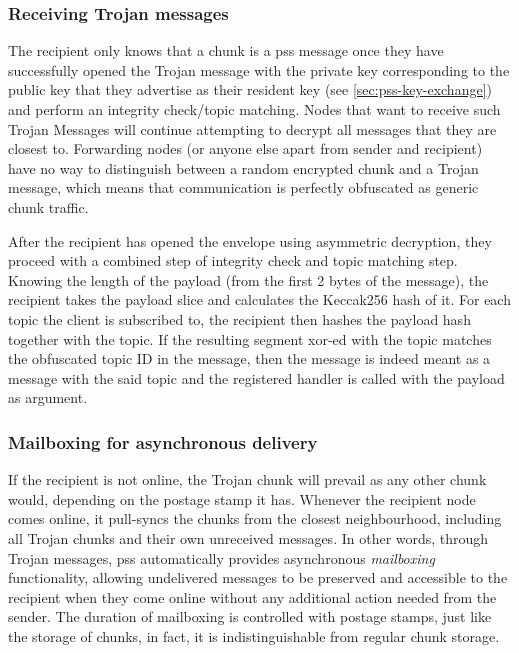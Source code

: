 \subsubsection{Receiving Trojan messages}

The recipient only knows that a chunk is a pss message once they have successfully opened the Trojan message with the private key corresponding to the public key that they advertise as their resident key (see \ref{sec:pss-key-exchange}) and perform an integrity check/topic matching. Nodes that want to receive such Trojan Messages will continue attempting to decrypt all messages that they are closest to. Forwarding nodes (or anyone else apart from sender and recipient) have no way to distinguish between a random encrypted chunk and a Trojan message, which means that communication is perfectly obfuscated as generic chunk traffic.

After the recipient has opened the envelope using asymmetric decryption, they proceed with a combined step of integrity check and topic matching step. Knowing the length of the payload (from the first 2 bytes of the message), the recipient takes the payload slice and calculates the Keccak256 hash of it. For each topic the client is subscribed to, the recipient then hashes the payload hash together with the topic. If the resulting segment xor-ed with the topic matches the obfuscated topic ID in the message, then the message is indeed meant as a message with the said topic and the registered handler is called with the payload as argument.

\subsubsection{Mailboxing for asynchronous delivery}

If the recipient is not online, the Trojan chunk will prevail as any other chunk would, depending on the postage stamp it has. Whenever the recipient node comes online, it pull-syncs the chunks from the closest neighbourhood, including all Trojan chunks and their own unreceived messages. In other words, through Trojan messages, pss automatically provides asynchronous \emph{mailboxing} functionality, allowing undelivered messages to be preserved and accessible to the recipient when they come online without any additional action needed from the sender. The duration of mailboxing is controlled with postage stamps, just like the storage of chunks, in fact, it is indistinguishable from regular chunk storage.

